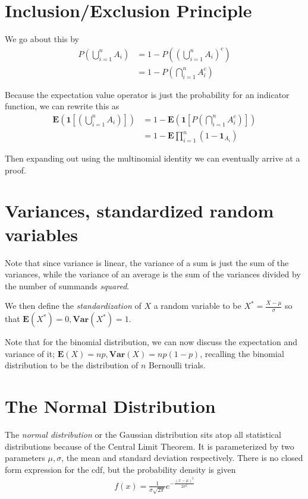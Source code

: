 \documentclass[10pt]{report}
\begin{document}
\section{Inclusion/Exclusion Principle}

We go about this by
\begin{align}
    P\left( \bigcup_{i=1}^n A_i \right) &= 1 - P\left( \left( \bigcup_{i=1}^n A_i \right)^c \right)\\
    &= 1 - P\left( \bigcap_{i=1}^n A_i^c \right)
\end{align}

Because the expectation value operator is just the probability for an indicator function, we can rewrite this as
\begin{align}
    \mathbf{E}\left(\mathbf{1}\left[\left( \bigcup_{i=1}^n A_i \right)\right]\right) &= 1 - \mathbf{E}\left( \mathbf{1}\left[ P\left( \bigcap_{i=1}^n A_i^c \right) \right] \right)\\
    &= 1 - \mathbf{E}\prod_{i=1}^n\left( 1 - \mathbf{1}_{A_i} \right)
\end{align}

Then expanding out using the multinomial identity we can eventually arrive at a proof.

\section{Variances, standardized random variables}

Note that since variance is linear, the variance of a sum is just the sum of the variances, while the variance of an average is the sum of the variances divided by the number of summands \emph{squared}. 

We then define the \emph{standardization} of $X$ a random variable to be $X^* = \frac{X - \mu}{\sigma}$ so that $\mathbf{E}(X^*) = 0, \mathbf{Var}(X^*) = 1$.

Note that for the binomial distribution, we can now discuss the expectation and variance of it; $\mathbf{E}(X) = np, \mathbf{Var}(X) = np(1-p)$, recalling the binomial distribution to be the distribution of $n$ Bernoulli trials. 

\section{The Normal Distribution}

The \emph{normal distribution} or the Gaussian distribution sits atop all statistical distributions because of the Central Limit Theorem. It is parameterized by two parameters $\mu, \sigma$, the mean and standard deviation respectively. There is no closed form expression for the cdf, but the probability density is given
\begin{align}
    f(x) = \frac{1}{\sigma\sqrt{2\pi}} e^{-\frac{(x-\mu)^2}{2\sigma^2}}
\end{align}
\end{document}
